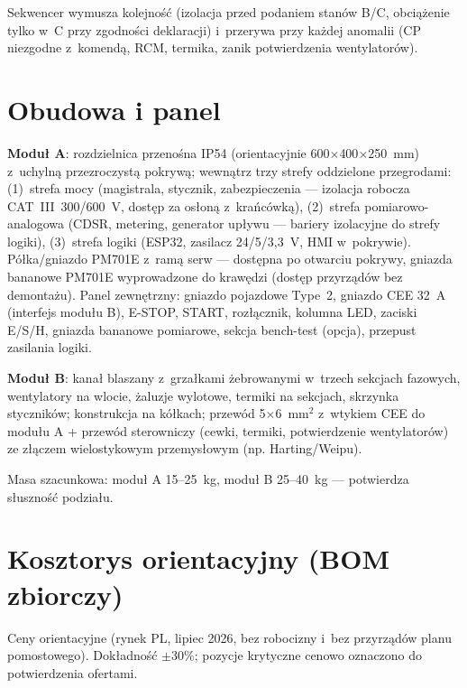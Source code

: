 \documentclass[11pt,a4paper]{article}
\begin{document}
Sekwencer wymusza kolejność (izolacja przed podaniem stanów B/C, obciążenie tylko w~C przy zgodności deklaracji) i~przerywa przy każdej anomalii (CP niezgodne z~komendą, RCM, termika, zanik potwierdzenia wentylatorów).

\section{Obudowa i panel}
\label{sec:obudowa}

\textbf{Moduł A}: rozdzielnica przenośna IP54 (orientacyjnie 600$\times$400$\times$250~mm) z~uchylną przezroczystą pokrywą; wewnątrz trzy strefy oddzielone przegrodami: (1)~strefa mocy (magistrala, stycznik, zabezpieczenia --- izolacja robocza CAT~III~300/600~V, dostęp za osłoną z~krańcówką), (2)~strefa pomiarowo-analogowa (CDSR, metering, generator upływu --- bariery izolacyjne do strefy logiki), (3)~strefa logiki (ESP32, zasilacz 24/5/3,3~V, HMI w~pokrywie). Półka/gniazdo PM701E z~ramą serw --- dostępna po otwarciu pokrywy, gniazda bananowe PM701E wyprowadzone do krawędzi (dostęp przyrządów bez demontażu). Panel zewnętrzny: gniazdo pojazdowe Type~2, gniazdo CEE 32~A (interfejs modułu B), E-STOP, START, rozłącznik, kolumna LED, zaciski E/S/H, gniazda bananowe pomiarowe, sekcja bench-test (opcja), przepust zasilania logiki.

\textbf{Moduł B}: kanał blaszany z~grzałkami żebrowanymi w~trzech sekcjach fazowych, wentylatory na wlocie, żaluzje wylotowe, termiki na sekcjach, skrzynka styczników; konstrukcja na kółkach; przewód 5$\times$6~mm$^2$ z~wtykiem CEE do modułu A + przewód sterowniczy (cewki, termiki, potwierdzenie wentylatorów) ze złączem wielostykowym przemysłowym (np. Harting/Weipu).

Masa szacunkowa: moduł A 15--25~kg, moduł B 25--40~kg --- potwierdza słuszność podziału.

\section{Kosztorys orientacyjny (BOM zbiorczy)}
\label{sec:kosztorys}

Ceny orientacyjne (rynek PL, lipiec 2026, bez robocizny i~bez przyrządów planu pomostowego). Dokładność $\pm$30\%; pozycje krytyczne cenowo oznaczono do potwierdzenia ofertami.
\end{document}
